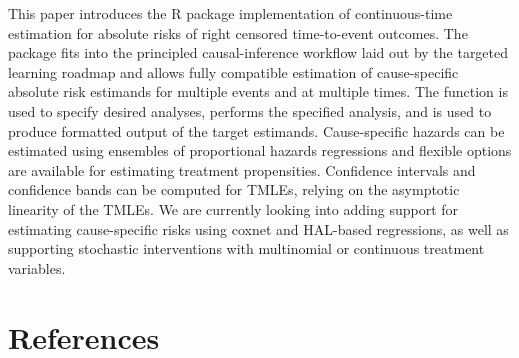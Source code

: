 This paper introduces the  R package implementation of continuous-time estimation for absolute risks of right censored time-to-event outcomes. The package fits into the principled causal-inference workflow laid out by the targeted learning roadmap and allows fully compatible estimation of cause-specific absolute risk estimands for multiple events and at multiple times. The  function is used to specify desired analyses,  performs the specified analysis, and  is used to produce formatted output of the target estimands. Cause-specific hazards can be estimated using ensembles of proportional hazards regressions and flexible options are available for estimating treatment propensities. Confidence intervals and confidence bands can be computed for TMLEs, relying on the asymptotic linearity of the TMLEs. We are currently looking into adding support for estimating cause-specific risks using coxnet and HAL-based regressions, as well as supporting stochastic interventions with multinomial or continuous treatment variables.

\hypertarget{references}{%
\section{References}\label{references}}



\address{%
David Chen\\
University of California, Berkeley\\%
\\
%
%
%
%
}

\address{%
Helene C. W. Rytgaard\\
University of Copenhagen\\%
\\
%
%
%
%
}

\address{%
Edwin Fong\\
Novo Nordisk\\%
\\
%
%
%
%
}

\address{%
Jens M. Tarp\\
Novo Nordisk\\%
\\
%
%
%
%
}

\address{%
Maya L. Petersen\\
University of California, Berkeley\\%
\\
%
%
%
%
}

\address{%
Mark J. van der Laan\\
University of California\\%
\\
%
%
%
%
}

\address{%
Thomas A. Gerds\\
University of Copenhagen\\%
\\
%
%
%
%
}
